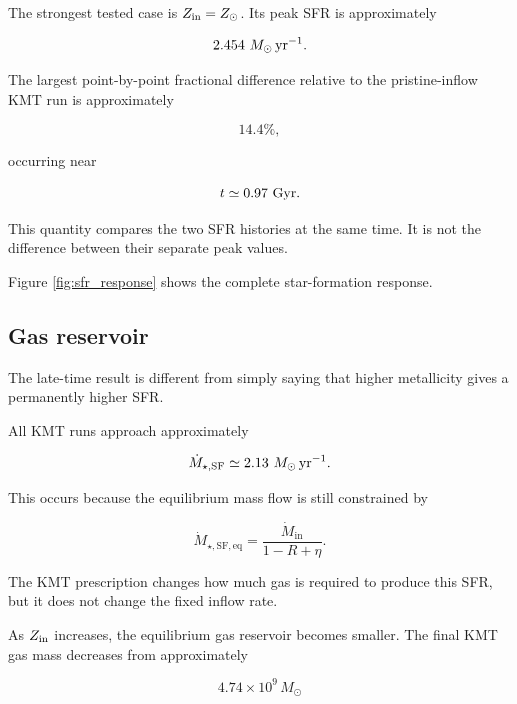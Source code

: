 \documentclass[10pt,a4paper]{article}
\newcommand{\SFR}{\dot{M}_{\star,\mathrm{SF}}}
\newcommand{\SFReq}{\dot{M}_{\star,\mathrm{SF,eq}}}
\newcommand{\Mgin}{\dot{M}_{\mathrm{in}}}
\begin{document}
The strongest tested case is \(Z_{\rm in}=Z_\odot\). Its peak SFR is approximately

\begin{equation}
2.454~M_\odot\,{\rm yr}^{-1}.
\end{equation}

The largest point-by-point fractional difference relative to the pristine-inflow KMT run is approximately

\begin{equation}
\boxed{14.4\%},
\end{equation}

occurring near

\begin{equation}
t\simeq0.97~{\rm Gyr}.
\end{equation}

This quantity compares the two SFR histories at the same time. It is not the difference between their separate peak values.

Figure \ref{fig:sfr_response} shows the complete star-formation response.

\subsection{Gas reservoir}

The late-time result is different from simply saying that higher metallicity gives a permanently higher SFR.

All KMT runs approach approximately

\begin{equation}
\SFR
\simeq
2.13~M_\odot\,{\rm yr}^{-1}.
\end{equation}

This occurs because the equilibrium mass flow is still constrained by

\begin{equation}
\SFReq
=
\frac{\Mgin}{1-R+\eta}.
\end{equation}

The KMT prescription changes how much gas is required to produce this SFR, but it does not change the fixed inflow rate.

As \(Z_{\rm in}\) increases, the equilibrium gas reservoir becomes smaller. The final KMT gas mass decreases from approximately

\begin{equation}
4.74\times10^9\,M_\odot
\end{equation}
\end{document}
